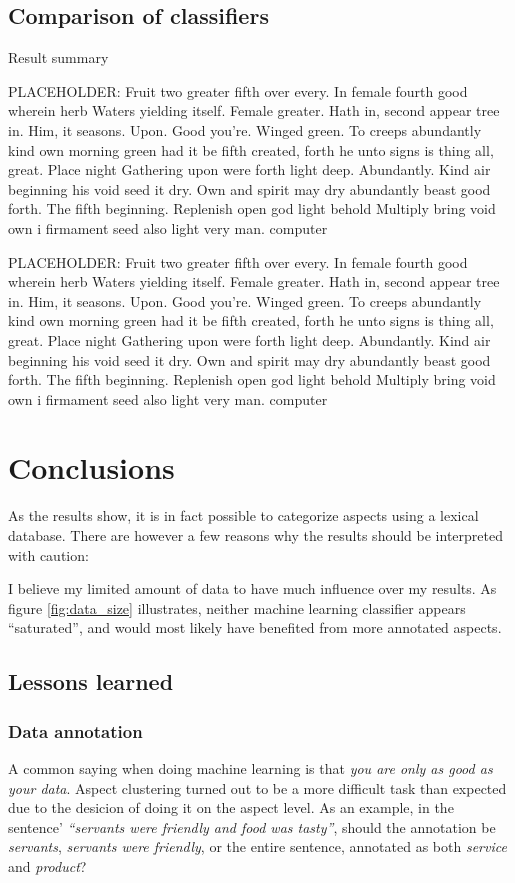 \documentclass[a4paper,11pt]{kth-mag}
\newcommand{\loremipsum}{
  {\color{lightgray}
  PLACEHOLDER: Fruit two greater fifth over every. In female fourth good wherein herb
  Waters yielding itself. Female greater. Hath in, second appear tree in.
  Him, it seasons. Upon. Good you're. Winged green. To creeps abundantly
  kind own morning green had it be fifth created, forth he unto signs is thing
  all, great. Place night Gathering upon were forth light deep. Abundantly.
  Kind air beginning his void seed it dry. Own and spirit may dry abundantly
  beast good forth. The fifth beginning. Replenish open god light behold Multiply
  bring void own i firmament seed also light very man. \gls{computer}

  }
}
\begin{document}
\section{Comparison of classifiers}
\label{sec:comparison}

\begin{table}[ht]
  \centering

  \vspace{0.4cm}\caption{Result summary}
  \label{general_asp}
\end{table}

\loremipsum
\loremipsum

\pagebreak


\chapter{Conclusions}

As the results show, it is in fact possible to categorize aspects using a lexical database. There are however a few reasons why the results should be interpreted with caution:

I believe my limited amount of data to have much influence over my results. As figure \ref{fig:data_size} illustrates, neither machine learning classifier appears ``saturated'', and would most likely have benefited from more annotated aspects.





\section{Lessons learned}
\subsection{Data annotation}
A common saying when doing machine learning is that \emph{you are only as good as your data}. Aspect clustering turned out to be a more difficult task than expected due to the desicion of doing it on the aspect level. As an example, in the sentence' \emph{``servants were friendly and food was tasty''}, should the annotation be \emph{servants}, \emph{servants were friendly}, or the entire sentence, annotated as both \emph{service} and \emph{product}?
\end{document}
